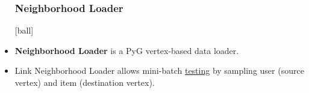 \documentclass{beamer}
\begin{document}
\begin{frame}[fragile]
\begin{itemize}
\frametitle{Neighborhood Loader}
[ball]

\item \textbf{Neighborhood Loader} is a PyG vertex-based data loader. 



\item Link Neighborhood Loader allows mini-batch \underline{testing} by sampling user (source vertex) and item (destination vertex). 



\end{itemize}
\end{frame}

\end{document}
